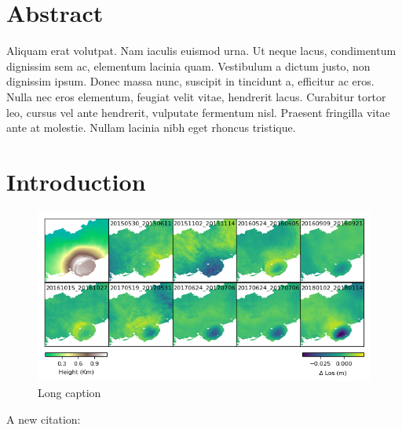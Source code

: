 \begin{refsection}
\section*{Abstract}
Aliquam erat volutpat. Nam iaculis euismod urna. Ut neque lacus, condimentum dignissim sem ac, elementum lacinia quam. Vestibulum a dictum justo, non dignissim ipsum. Donec massa nunc, suscipit in tincidunt a, efficitur ac eros. Nulla nec eros elementum, feugiat velit vitae, hendrerit lacus. Curabitur tortor leo, cursus vel ante hendrerit, vulputate fermentum nisl. Praesent fringilla vitae ante at molestie. Nullam lacinia nibh eget rhoncus tristique.



\section{Introduction} %
\label{sec:intro}

\begin{figure}[tbp]
	\centering
	\includegraphics[width=1\textwidth]{./publication1_figures/figure_4_sn_ifgs.png}
	\caption[Short Caption]{Long caption}
	\label{fig:label2}
\end{figure}



A new citation: \citep{Bernard1997}



\printbibliography[heading=subbibliography]
\end{refsection}
